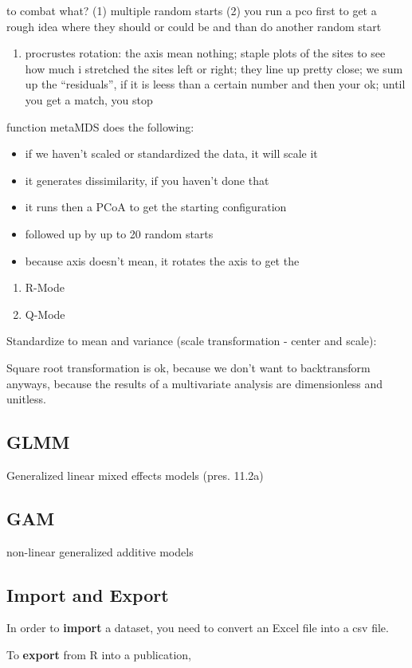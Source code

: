 \documentclass[]{article}
\providecommand{\tightlist}{%
  \setlength{\itemsep}{0pt}\setlength{\parskip}{0pt}}
\begin{document}
to combat what? (1) multiple random starts (2) you run a pco first to
get a rough idea where they should or could be and than do another
random start

\begin{enumerate}
\def\labelenumi{(\arabic{enumi})}
\setcounter{enumi}{6}
\tightlist
\item
  procrustes rotation: the axis mean nothing; staple plots of the sites
  to see how much i stretched the sites left or right; they line up
  pretty close; we sum up the ``residuals'', if it is leess than a
  certain number and then your ok; until you get a match, you stop
\end{enumerate}

function metaMDS does the following:

\begin{itemize}
\tightlist
\item
  if we haven't scaled or standardized the data, it will scale it
\item
  it generates dissimilarity, if you haven't done that
\item
  it runs then a PCoA to get the starting configuration
\item
  followed up by up to 20 random starts
\item
  because axis doesn't mean, it rotates the axis to get the
\end{itemize}

\begin{enumerate}
\def\labelenumi{(\arabic{enumi})}
\item
  R-Mode
\item
  Q-Mode
\end{enumerate}

Standardize to mean and variance (scale transformation - center and
scale):

Square root transformation is ok, because we don't want to backtransform
anyways, because the results of a multivariate analysis are
dimensionless and unitless.

\subsection{GLMM}\label{glmm}

Generalized linear mixed effects models (pres. 11.2a)

\subsection{GAM}\label{gam}

non-linear generalized additive models

\subsection{Import and Export}\label{import-and-export}

In order to \textbf{import} a dataset, you need to convert an Excel file
into a csv file.

To \textbf{export} from R into a publication,
\end{document}
